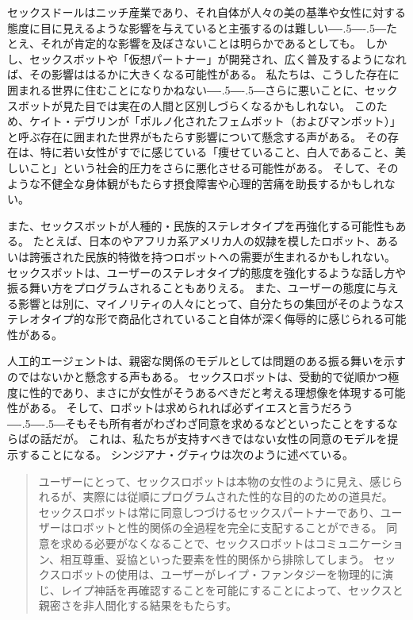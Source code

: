 \documentclass[paper=a4,book,openany]{jlreq}
\def\DDASH{―\kern-.5\zw―\kern-.5\zw―} %
\begin{document}
セックスドールはニッチ産業であり、それ自体が人々の美の基準や女性に対する態度に目に見えるような影響を与えていると主張するのは難しい{\DDASH}たとえ、それが肯定的な影響を及ぼさないことは明らかであるとしても。
しかし、セックスボットや「仮想パートナー」が開発され、広く普及するようになれば、その影響ははるかに大きくなる可能性がある。
私たちは、こうした存在に囲まれる世界に住むことになりかねない{\DDASH}さらに悪いことに、セックスボットが見た目では実在の人間と区別しづらくなるかもしれない。
このため、ケイト・デヴリンが「ポルノ化されたフェムボット（およびマンボット）」と呼ぶ存在に囲まれた世界がもたらす影響について懸念する声がある\citep[cf.][]{devlin19:_turned}。
その存在は、特に若い女性がすでに感じている「痩せていること、白人であること、美しいこと」という社会的圧力をさらに悪化させる可能性がある。
そして、そのような不健全な身体観がもたらす摂食障害や心理的苦痛を助長するかもしれない。

また、セックスボットが人種的・民族的ステレオタイプを再強化する可能性もある。
たとえば、日本のやアフリカ系アメリカ人の奴隷を模したロボット、あるいは誇張された民族的特徴を持つロボットへの需要が生まれるかもしれない。
セックスボットは、ユーザーのステレオタイプ的態度を強化するような話し方や振る舞い方をプログラムされることもありえる。
また、ユーザーの態度に与える影響とは別に、マイノリティの人々にとって、自分たちの集団がそのようなステレオタイプ的な形で商品化されていること自体が深く侮辱的に感じられる可能性がある。

人工的エージェントは、親密な関係のモデルとしては問題のある振る舞いを示すのではないかと懸念する声もある。
セックスロボットは、受動的で従順かつ極度に性的であり、まさにが女性がそうあるべきだと考える理想像を体現する可能性がある。
そして、ロボットは求められれば必ずイエスと言うだろう{\DDASH}そもそも所有者がわざわざ同意を求めるなどといったことをするならばの話だが。
これは、私たちが支持すべきではない女性の同意のモデルを提示することになる。
シンジアナ・グティウは次のように述べている。

\begin{quote}
 ユーザーにとって、セックスロボットは本物の女性のように見え、感じられるが、実際には従順にプログラムされた性的な目的のための道具だ。
セックスロボットは常に同意しつづけるセックスパートナーであり、ユーザーはロボットと性的関係の全過程を完全に支配することができる。
同意を求める必要がなくなることで、セックスロボットはコミュニケーション、相互尊重、妥協といった要素を性的関係から排除してしまう。
セックスロボットの使用は、ユーザーがレイプ・ファンタジーを物理的に演じ、レイプ神話を再確認することを可能にすることによって、セックスと親密さを非人間化する結果をもたらす。
\citep[p.187]{gutiu16:_robot_consen}
\end{quote}
\end{document}

